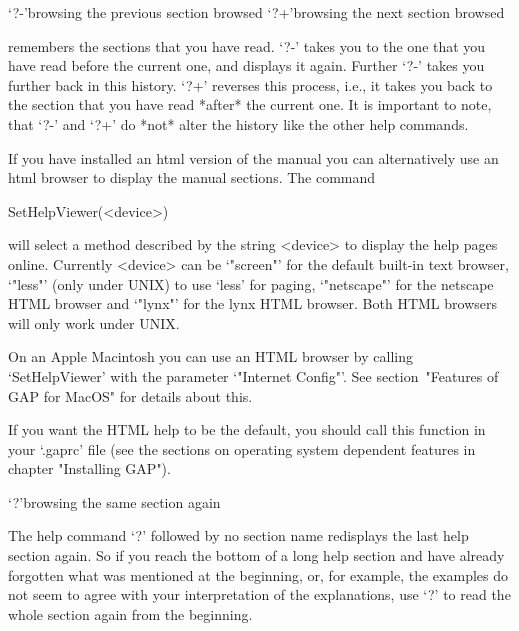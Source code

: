 \>`?-'{browsing the previous section browsed}
\>`?+'{browsing the next section browsed}

{\GAP} remembers the sections that you have read. `?-' takes you to the
one that you have read before the current one, and displays it again.
Further `?-' takes you further back in this history. `?+' reverses this
process, i.e., it takes you back to the section that you have read
*after* the current one. It is important to note, that `?-' and `?+' do
*not* alter the history like the other help commands.




If you have installed an html version of the manual you can
alternatively use an html browser to display the manual sections. The
command

\>SetHelpViewer(<device>)

will select a method described by the string <device> to display the help
pages online. Currently <device> can be `"screen"' for the default built-in
text browser, `"less"' (only under UNIX) to use `less' for paging,
`"netscape"' for the netscape HTML browser and `"lynx"' for the
lynx HTML browser. Both HTML browsers will only work under UNIX. 

On an Apple Macintosh you can use an HTML browser by calling `SetHelpViewer'
with the parameter `"Internet Config"'.
See section~"Features of GAP for MacOS" for details about this.

If you want the HTML help to be the default, you should call this function
in your `.gaprc' file (see the sections on operating
system dependent features in chapter "Installing GAP").



\>`?'{browsing the same section again}

The help command `?' followed by no section name redisplays the last help
section again. So if you reach the bottom of a long help section and have
already forgotten what was mentioned at the beginning, or, for example, the
examples do not seem to agree with your interpretation of the
explanations, use `?' to read the whole section again from the beginning.

